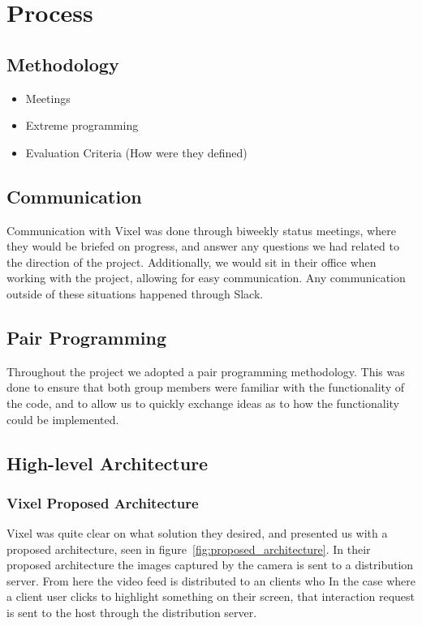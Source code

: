 \section{Process}
\subsection{Methodology}
\begin{itemize}
    \item Meetings
    \item Extreme programming
    \item Evaluation Criteria (How were they defined)
\end{itemize}

\subsection{Communication}
Communication with Vixel was done through biweekly status meetings, where they would be briefed on progress, and answer any questions we had related to the direction of the project. Additionally, we would sit in their office when working with the project, allowing for easy communication. Any communication outside of these situations happened through Slack.

\subsection{Pair Programming}
Throughout the project we adopted a pair programming methodology. This was done to ensure that both group members were familiar with the functionality of the code, and to allow us to quickly exchange ideas as to how the functionality could be implemented.

\subsection{High-level Architecture}
\subsubsection{Vixel Proposed Architecture}
Vixel was quite clear on what solution they desired, and presented us with a proposed architecture, seen in figure~\ref{fig:proposed_architecture}. In their proposed architecture the images captured by the camera is sent to a distribution server. From here the video feed is distributed to an clients who 
In the case where a client user clicks to highlight something on their screen, that interaction request is sent to the host through the distribution server.


